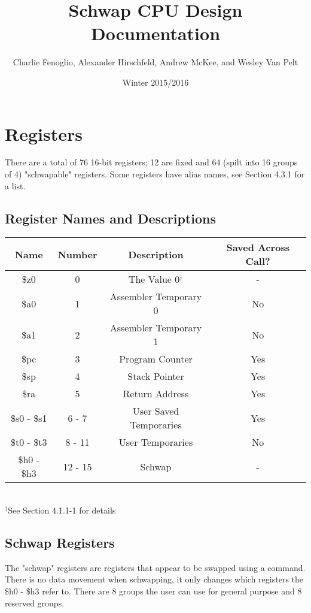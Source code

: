 \documentclass{article}
\title{Schwap CPU Design Documentation}
\author{Charlie Fenoglio, Alexander Hirschfeld, Andrew McKee, and Wesley Van Pelt}
\date{Winter 2015/2016}
\begin{document}
\maketitle
\section{Registers}
	There are a total of 76 16-bit registers; 12 are fixed and 64 (spilt into 16 groups of 4) "schwapable" registers.  Some registers have alias names, see Section 4.3.1 for a list.
	\subsection{Register Names and Descriptions}
		\begin{center}
			\begin{tabular}{| c | c | c | c |}
				\hline
				    Name        & Number  & Description            & Saved Across Call? \\ \hline
				    \$z0        & 0       & The Value 0$^\dagger$  & -   \\ \hline
				    \$a0        & 1       & Assembler Temporary 0  & No  \\ \hline
				    \$a1        & 2       & Assembler Temporary 1  & No  \\ \hline
				    \$pc        & 3       & Program Counter        & Yes \\ \hline
				    \$sp        & 4       & Stack Pointer          & Yes \\ \hline
				    \$ra        & 5       & Return Address         & Yes \\ \hline
				    \$s0 - \$s1 & 6 - 7   & User Saved Temporaries & Yes \\ \hline
				    \$t0 - \$t3 & 8 - 11  & User Temporaries       & No  \\ \hline
				    \$h0 - \$h3 & 12 - 15 & Schwap                 & -   \\
				\hline
			\end{tabular} \\
			$^\dagger$See Section 4.1.1-1 for details
		\end{center}
	\subsection{Schwap Registers}
		The "schwap" registers are registers that appear to be swapped using a command.  There is no data movement when schwapping, it only changes which registers the \$h0 - \$h3 refer to.  There are 8 groups the user can use for general purpose and 8 reserved groups.
\end{document}

